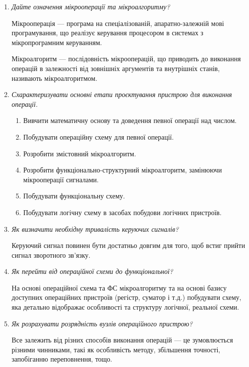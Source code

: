 \documentclass[12pt,a4paper]{article}
\begin{document}
\begin{enumerate}
        \item \textit{Дайте означення мікрооперації та мікроалгоритму?}
        
        Мікрооперація --- програма на спеціалізованій, апаратно-залежній мові програмування, що реалізує керування процесором в системах з мікропрограмним керуванням.

        Мікроалгоритм --- послідовність мікрооперацій, що приводить до виконання операцій в залежності від зовнішніх аргументів та внутрішніх станів, називають мікроалгоритмом.

        \item \textit{Схарактеризувати основні етапи проєктування пристрою для виконання операції.}
        
        \begin{enumerate}
            \item Вивчити математичну основу та доведення певної операції над числом.
            \item Побудувати операційну схему для певної операції.
            \item Розробити змістовний мікроалгоритм.
            \item Розробити функціонально-структурний мікроалгоритм, замінюючи мікрооперації сигналами.
            \item Побудувати функціональну схему.
            \item Побудувати логічну схему в засобах побудови логічних пристроїв.
        \end{enumerate}

        \vspace{1em}

        \item \textit{Як визначити необхідну тривалість керуючих сигналів?}
        
        Керуючий сигнал повинен бути достатньо довгим для того, щоб встиг прийти сигнал зворотного зв'язку.

        \vspace{1em}

        \item \textit{Як перейти від операційної схеми до функціональної?}
        
        На основі операційної схема та ФС мікроалгоритму та на основі базису доступних операційних пристроїв (регістр, суматор і т.д.) побудувати схему, яка детально відображає особливості та структуру
        логічної, реальної схеми.

        \vspace{1em}

        \item \textit{Як розрахувати розрядність вузлів операційного пристрою?}
        
        Все залежить від різних способів виконання операцій --- це зумовлюється різними чинниками, такі як особливість методу, збільшення точності, запобіганню переповнення, тощо.

    \end{enumerate}
\end{document}
